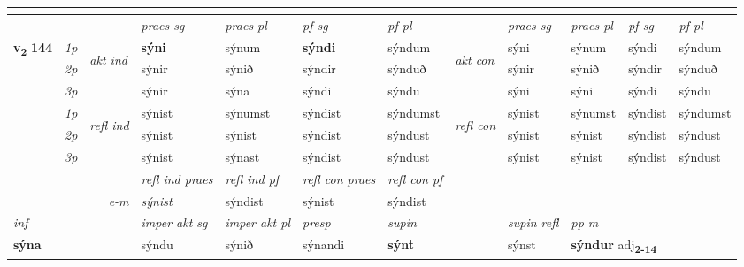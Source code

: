 \begin{longtable}[l]{X>{\footnotesize\itshape}llXXXXlXXXX}
\midrule
  & \\
   \midrule
 & &   & \textit{praes sg}  & \textit{praes pl}    & \textit{ pf sg} & \textit{pf pl} & & \textit{praes sg}  & \textit{praes pl}    & \textit{pf sg} & \textit{pf pl }  \\ \cmidrule{4-7} \cmidrule{9-12}
 \multirow{2}{*}{{{\textbf{v{\textsubscript{2}}} \Large{\textbf{144}}}}}  & 1p & \multirow{3}{*}{\begin{turn}{90}\textit{akt ind}\end{turn}} & \textbf{sýni} & sýnum & \textbf{sýndi} & sýndum & \multirow{3}{*}{\begin{turn}{90}\textit{akt con}\end{turn}} &sýni & sýnum & sýndi & sýndum\\*
 & 2p &  &  sýnir  & sýnið & sýndir & sýnduð & & sýnir & sýnið & sýndir & sýnduð \\*
 & 3p &  & sýnir & sýna & sýndi & sýndu & & sýni & sýni& sýndi & sýndu \\*
\cmidrule{4-7} \cmidrule{9-12}
 & 1p & \multirow{3}{*}{\begin{turn}{90}\textit{refl ind}\end{turn}}  & sýnist & sýnumst & sýndist & sýndumst & \multirow{3}{*}{\begin{turn}{90}\textit{refl con}\end{turn}}  &sýnist & sýnumst & sýndist & sýndumst \\*
 & 2p &  & sýnist & sýnist & sýndist & sýndust & &sýnist & sýnist & sýndist & sýndust \\*
 & 3p  & & sýnist & sýnast & sýndist & sýndust & & sýnist & sýnist& sýndist & sýndust \\*
\cmidrule{4-7} \cmidrule{9-12}

 & && \textit{refl ind praes} & \textit{refl ind pf} & \textit{refl con praes} & \textit{refl con pf} \\*
\multicolumn{3}{r}{\textit{e-m}}& sýnist & sýndist & sýnist & sýndist \\*

\cmidrule{4-7}
   {\textit{inf}} & &  & \textit{imper akt sg} & \textit{imper akt pl}   & \textit{presp} & \textit{supin} && \textit{supin refl} & \textit{pp m} \\*
  {\textbf{sýna}} & && sýndu  & sýnið   & sýnandi &  \textbf{sýnt} && sýnst & \multicolumn{2}{l}{\textbf{sýndur} adj\textbf{\textsubscript{2-14}}} \\*

\midrule


\end{longtable}
